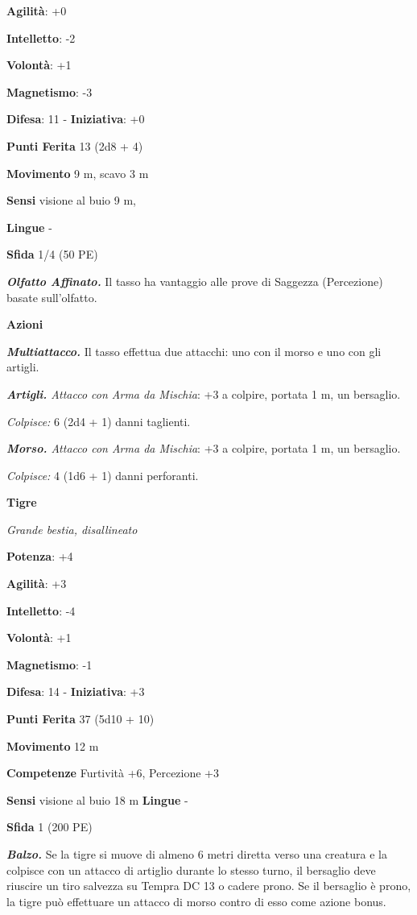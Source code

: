 \begin{multicols}{2}
\textbf{Agilità}: +0

\textbf{Intelletto}: -2

\textbf{Volontà}: +1

\textbf{Magnetismo}: -3

\textbf{Difesa}: 11 - \textbf{Iniziativa}: +0

\textbf{Punti Ferita} 13 (2d8 + 4)

\textbf{Movimento} 9 m, scavo 3 m

\textbf{Sensi} visione al buio 9 m, 

\textbf{Lingue} -

\textbf{Sfida} 1/4 (50 PE)\smallskip

\emph{\textbf{Olfatto Affinato.}} Il tasso ha vantaggio alle prove di
Saggezza (Percezione) basate sull'olfatto.

\smallskip\textbf{Azioni}

\emph{\textbf{Multiattacco.}} Il tasso effettua due attacchi: uno con il
morso e uno con gli artigli.

\emph{\textbf{Artigli.} Attacco con Arma da Mischia}: +3 a colpire,
portata 1 m, un bersaglio.

\emph{Colpisce:} 6 (2d4 + 1) danni taglienti.

\emph{\textbf{Morso.} Attacco con Arma da Mischia}: +3 a colpire,
portata 1 m, un bersaglio.

\emph{Colpisce:} 4 (1d6 + 1) danni perforanti.

\textbf{Tigre}

\emph{Grande bestia, disallineato}

\textbf{Potenza}: +4

\textbf{Agilità}: +3

\textbf{Intelletto}: -4

\textbf{Volontà}: +1

\textbf{Magnetismo}: -1

\textbf{Difesa}: 14 - \textbf{Iniziativa}: +3

\textbf{Punti Ferita} 37 (5d10 + 10)

\textbf{Movimento} 12 m

\textbf{Competenze} Furtività +6, Percezione +3

\textbf{Sensi} visione al buio 18 m
\textbf{Lingue} -

\textbf{Sfida} 1 (200 PE)\smallskip

\emph{\textbf{Balzo.}} Se la tigre si muove di almeno 6 metri diretta
verso una creatura e la colpisce con un attacco di artiglio durante lo
stesso turno, il bersaglio deve riuscire un tiro salvezza su Tempra DC 13
o cadere prono. Se il bersaglio è prono, la tigre può effettuare un
attacco di morso contro di esso come azione bonus.


\end{multicols}
